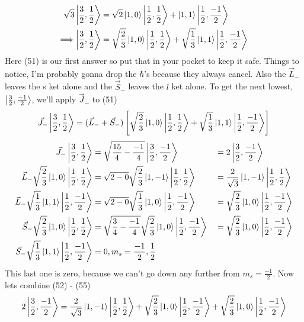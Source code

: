 \documentclass{article}
\begin{document}
\begin{enumerate}[label=\alph*)]
\begin{align}
		\sqrt{3} \ket{\frac{3}{2}, \frac{1}{2}} &= \sqrt{2} \ket{1, 0}\ket{\frac{1}{2}, \frac{1}{2}} + \ket{1, 1}\ket{\frac{1}{2}, \frac{-1}{2}} \\
		\Longrightarrow \ket{\frac{3}{2}, \frac{1}{2}} &= \sqrt{\frac{2}{3}} \ket{1, 0}\ket{\frac{1}{2}, \frac{1}{2}} + \sqrt{\frac{1}{3}}\ket{1, 1}\ket{\frac{1}{2}, \frac{-1}{2}}
	\end{align}
	Here (51) is our first answer so put that in your pocket to keep it safe. Things to notice, I'm probably gonna drop the $\hbar$'s because they always cancel. Also the $\vec{L}_-$ leaves the s ket alone and the $\vec{S}_-$ leaves the $l$ ket alone. To get the next lowest, $\ket{\frac{3}{2},\frac{-1}{2}}$, we'll apply $\vec{J}_-$ to (51)
	\[
	\vec{J}_{-}\ket{\frac{3}{2}, \frac{1}{2}} = (\vec{L}_- +\vec{S}_-)\left[ \sqrt{\frac{2}{3}} \ket{1, 0} \ket{\frac{1}{2},\frac{1}{2}}  + \sqrt{\frac{1}{3}}\ket{1, 1}\ket{\frac{1}{2}, \frac{-1}{2}} \right] 
	\]
	\begin{alignat}{3}
		\vec{J}_-\ket{\frac{3}{2}, \frac{1}{2}} &= \sqrt{ \frac{15}{4} - \frac{-1}{4}} \ket{\frac{3}{2}, \frac{-1}{2}} &&= 2 \ket{\frac{3}{2}, \frac{-1}{2}} \\
		\vec{L}_- \sqrt{\frac{2}{3}} \ket{1, 0}\ket{\frac{1}{2}, \frac{1}{2}} &= \sqrt{2-0}\sqrt{\frac{2}{3}} \ket{1, -1}\ket{\frac{1}{2}, \frac{1}{2}} &&= \frac{2}{\sqrt{3}} \ket{1, -1}\ket{\frac{1}{2}, \frac{1}{2}} \\
		\vec{L}_- \sqrt{\frac{1}{3}} \ket{1, 1}\ket{\frac{1}{2}, \frac{-1}{2}} &= \sqrt{2-0}\sqrt{\frac{1}{3}} \ket{1, 0}\ket{\frac{1}{2}, \frac{-1}{2}} &&= \sqrt{\frac{2}{3}} \ket{1, 0}\ket{\frac{1}{2}, \frac{-1}{2}} \\
		\vec{S}_- \sqrt{\frac{2}{3}} \ket{1, 0}\ket{\frac{1}{2}, \frac{1}{2}} &= \sqrt{\frac{3}{4} - \frac{-1}{4}} \sqrt{\frac{2}{3}} \ket{1, 0}\ket{\frac{1}{2}, \frac{-1}{2}} &&= \sqrt{\frac{2}{3}} \ket{1, 0}\ket{\frac{1}{2}, \frac{-1}{2}} \\
		\vec{S}_- \sqrt{\frac{1}{3}} \ket{1, 1}\ket{\frac{1}{2}, \frac{-1}{2}} &= 0, m_s = \frac{-1}{2}, \frac{1}{2}
	\end{alignat}
	This last one is zero, because we can't go down any further from $m_s = \frac{-1}{2}$. Now lets combine (52) - (55)
	\begin{align}
		2 \ket{\frac{3}{2}, \frac{-1}{2}} &= \frac{2}{\sqrt{3}} \ket{1, -1}\ket{\frac{1}{2}, \frac{1}{2}} + \sqrt{\frac{2}{3}} \ket{1, 0}\ket{\frac{1}{2}, \frac{-1}{2}} + \sqrt{\frac{2}{3}} \ket{1, 0}\ket{\frac{1}{2}, \frac{-1}{2}} \\

\end{align}
\end{enumerate}
\end{document}

